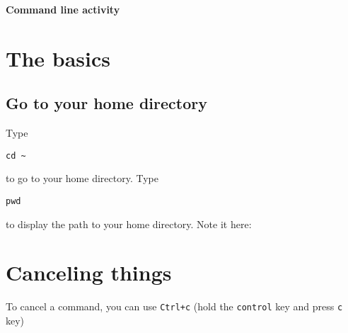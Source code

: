 \documentclass[12pt]{article}
\begin{document}
\begin{center}
\Large{\textbf{Command line activity}}\\
\end{center}

\section{The basics}
\subsection{Go to your home directory}
Type 
\begin{verbatim}
cd ~
\end{verbatim}
to go to your home directory. Type 
\begin{verbatim}
pwd
\end{verbatim}
to display the path to your home directory. Note it here:
\vspace{.2in}


\section{Canceling things}
To cancel a command, you can use \texttt{Ctrl+c} (hold the \texttt{control} key and press \texttt{c} key)
\end{document}

